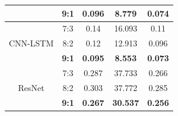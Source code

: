 \documentclass[conference]{IEEEtran}
\begin{document}
\begin{table}[H]
\begin{tabular}{|c|c|c|c|c|}
 & \textbf{9:1} & \textbf{0.096} & \textbf{8.779} & \textbf{0.074} \\
 \hline
 \multirow{3}{*}{CNN-LSTM} & 7:3 & 0.14 & 16.093 & 0.11 \\ 
 & 8:2 & 0.12 & 12.913 & 0.096 \\ 
 & \textbf{9:1} & \textbf{0.095} & \textbf{8.553} & \textbf{0.073} \\
 \hline
 \multirow{3}{*}{ResNet} & 7:3 & 0.287 & 37.733 & 0.266 \\ 
 & 8:2 & 0.303 & 37.772 & 0.285 \\ 
 & \textbf{9:1} & \textbf{0.267} & \textbf{30.537} & \textbf{0.256} \\
 \hline

\end{tabular}
\label{FPTresult}

\end{table}
\end{document}
